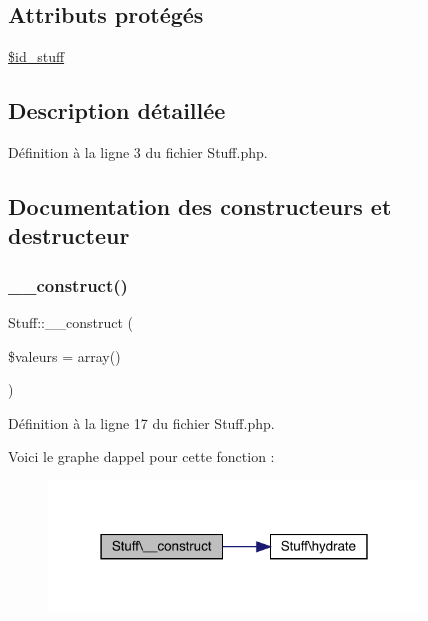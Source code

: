 \subsection*{Attributs protégés}
\begin{DoxyCompactItemize}
\item 
\mbox{\hyperlink{class_stuff_ace04f41811a75400a1f84183035179f2}{\$id\+\_\+stuff}}
\end{DoxyCompactItemize}


\subsection{Description détaillée}


Définition à la ligne 3 du fichier Stuff.\+php.



\subsection{Documentation des constructeurs et destructeur}
\mbox{\label{class_stuff_a85fa1bd0e8d0c382a2860f32ae2dfb1d}} 
\subsubsection{\texorpdfstring{\+\_\+\+\_\+construct()}{\_\_construct()}}
{\footnotesize\ttfamily Stuff\+::\+\_\+\+\_\+construct (\begin{DoxyParamCaption}\item[{}]{\$valeurs = {\ttfamily array()} }\end{DoxyParamCaption})}



Définition à la ligne 17 du fichier Stuff.\+php.

Voici le graphe d\textquotesingle{}appel pour cette fonction \+:\nopagebreak
\begin{figure}[H]
\begin{center}
\leavevmode
\includegraphics[width=279pt]{class_stuff_a85fa1bd0e8d0c382a2860f32ae2dfb1d_cgraph}
\end{center}
\end{figure}



